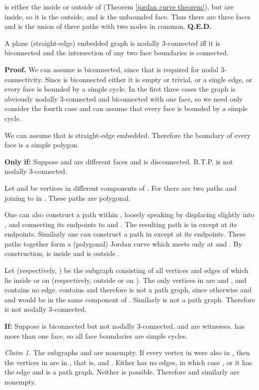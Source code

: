  is either the inside or outside of 
(Theorem \ref{jordan curve theorem}), but 
are inside, so it is the outside, and  is the
unbounded face.  Thus there are three faces and
 is the union of three paths 
with two nodes in common.
{\bf Q.E.D.}\medskip

\begin{theorem}
\label{planar nodally 3-connected} A plane (straight-edge)
embedded graph is nodally 3-connected iff it is biconnected and
the intersection of any two face boundaries is connected.
\end{theorem}

{\bf Proof.} We can assume  is biconnected,
since that is required for nodal 3-connectivity.
Since  is biconnected either it is empty or
trivial, or a single edge, or
every face is bounded by a simple cycle.
In the first three cases the graph is obviously
nodally 3-connected and
biconnected with one face, so we need
only consider the fourth case and can assume that every face is bounded by
a simple cycle.

We can assume that  is straight-edge embedded. Therefore
the boundary of every face is a simple polygon.

{\bf Only if:} Suppose  and  are different faces and
 is disconnected. R.T.P.
 is not nodally 3-connected.

Let
 and  be vertices in different components of
.  For 
there are two paths  and  joining
 to  in .  These paths
are polygonal.

One can also construct a path  within , loosely speaking
by displacing  slightly into , and connecting its endpoints
to  and .  The resulting path is in
 except at its endpoints.  Similarly one can construct
a path  in  except at its endpoints.
These paths together form a (polygonal) Jordan curve  which 
meets  only at  and .  By construction, 
is inside  and  is outside .

Let  (respectively, ) be the subgraph consisting of all
vertices and edges of 
which lie inside or on  (respectively, outside or on ).
The only vertices in  are  and , and 
contains no edge.  contains
 and therefore is not a path graph, since otherwise
 and  and  would be in the same component of
.
Similarly  is not a path graph.  Therefore
 is not nodally 3-connected.\hfil\break

{\bf If:}  Suppose  is biconnected but not nodally 3-connected,
and  are witnesses.   has more than one face,
so all face boundaries are simple cycles.

{\em Claim 1.} The subgraphs
 and  are nonempty.
If every vertex in  were also in ,
then the vertices in  are in ,
that is,  and .  Either  has no
edges, in which case , or
it has the edge  and is a path graph.
Neither is possible.  Therefore 
and similarly  are nonempty.

